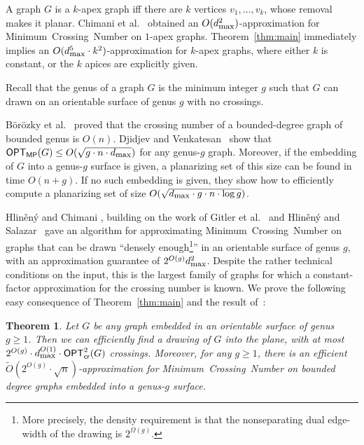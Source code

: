 \documentclass[twoside,leqno,twocolumn]{article}
\newtheorem{theorem}{Theorem}
\newcommand{\MCN}{\mbox{\sf Minimum Crossing Number}\xspace}
\newcommand{\optmp}[1]{\mathsf{OPT}_{\mathsf{MP}}(#1)}
\newcommand{\optcrosq}[1]{\mathsf{OPT}^{2}_{\mathsf{cr}}(#1)}
\newcommand{\dmax}{d_{\mbox{\textup{\footnotesize{max}}}}}
\begin{document}
A graph $G$ is a $k$-apex graph iff there are $k$ vertices $v_1,\ldots,v_k$, whose removal makes it planar. Chimani et al.~\cite{crossing_apex} obtained an $O(\dmax^2)$-approximation for \MCN on $1$-apex graphs. Theorem~\ref{thm:main} immediately implies an $O(\dmax^5\cdot k^2)$-approximation for $k$-apex graphs, where either $k$ is constant, or  the $k$ apices are explicitly given.



Recall that the genus of a graph $G$ is the minimum integer $g$ such that $G$ can drawn on an orientable surface of genus $g$ with no crossings.


B\"{o}r\"{o}zky et al.~\cite{BorozkyPT06} proved that 
the crossing number of a bounded-degree graph of bounded genus is $O(n)$.
Djidjev and Venkatesan~\cite{genus-planarization} show that $\optmp{G}\leq O(\sqrt{g\cdot n\cdot \dmax})$ for any genus-$g$ graph. Moreover, if the embedding of $G$ into a genus-$g$ surface is given, a planarizing set of this size can be found in time $O(n+g)$.
If no such embedding is given, they show how to efficiently compute a planarizing set of size $O(\sqrt{\dmax\cdot  g\cdot n\cdot \log g})$.

Hlin\v{e}n\'{y} and Chimani \cite{crossing_genus}, building on the work of Gitler et al.~\cite{crossing_projective} and Hlin\v{e}n\'{y} and Salazar~\cite{crossing_torus}  gave an algorithm for approximating \MCN on graphs that can be drawn ``densely enough\footnote{More precisely, the density requirement is that the nonseparating dual edge-width of the drawing is $2^{\Omega(g)}$.}'' in an orientable surface of genus $g$,
with an approximation guarantee of $2^{O(g)}\dmax^2$. \iffull
Despite the rather technical conditions on the input, this is the largest family of graphs for which a constant-factor approximation for the crossing number is known.\fi
We prove the following easy consequence of Theorem~\ref{thm:main} and the result of~\cite{crossing_genus}:


\begin{theorem}\label{thm: bounded genus}
Let $G$ be any graph embedded in an orientable surface of genus $g\geq 1$.
Then we can efficiently find a drawing of $G$ into the plane, with at most $2^{O(g)} \cdot \dmax^{O(1)} \cdot \optcrosq{G}$ crossings.
Moreover, for any $g\geq 1$, there is an efficient $\tilde{O}\left(2^{O(g)} \cdot \sqrt{n}\right)$-approximation for \MCN on bounded degree graphs embedded into a genus-$g$ surface.
\end{theorem}
\end{document}
